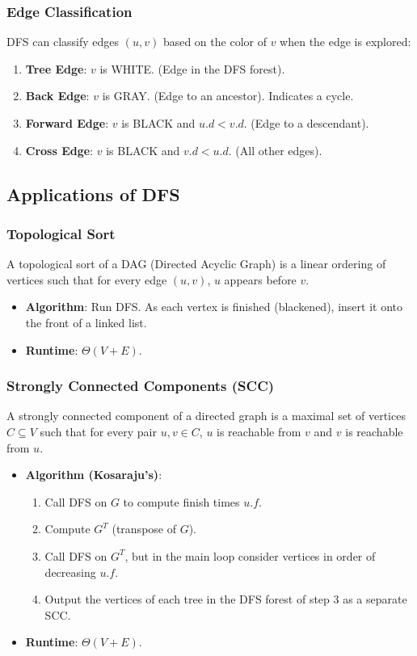 \documentclass[12pt]{article}
\theoremstyle{blueplain}
\theoremstyle{bluedef}
\theoremstyle{blueremark}
\begin{document}
\subsubsection{Edge Classification}
DFS can classify edges $(u, v)$ based on the color of $v$ when the edge is explored:
\begin{enumerate}
    \item \textbf{Tree Edge}: $v$ is WHITE. (Edge in the DFS forest).
    \item \textbf{Back Edge}: $v$ is GRAY. (Edge to an ancestor). Indicates a cycle.
    \item \textbf{Forward Edge}: $v$ is BLACK and $u.d < v.d$. (Edge to a descendant).
    \item \textbf{Cross Edge}: $v$ is BLACK and $v.d < u.d$. (All other edges).
\end{enumerate}

\subsection{Applications of DFS}

\subsubsection{Topological Sort}
A topological sort of a DAG (Directed Acyclic Graph) is a linear ordering of vertices such that for every edge $(u, v)$, $u$ appears before $v$.
\begin{itemize}
    \item \textbf{Algorithm}: Run DFS. As each vertex is finished (blackened), insert it onto the front of a linked list.
    \item \textbf{Runtime}: $\Theta(V + E)$.
\end{itemize}

\subsubsection{Strongly Connected Components (SCC)}
A strongly connected component of a directed graph is a maximal set of vertices $C \subseteq V$ such that for every pair $u, v \in C$, $u$ is reachable from $v$ and $v$ is reachable from $u$.
\begin{itemize}
    \item \textbf{Algorithm (Kosaraju's)}:
          \begin{enumerate}
              \item Call DFS on $G$ to compute finish times $u.f$.
              \item Compute $G^T$ (transpose of $G$).
              \item Call DFS on $G^T$, but in the main loop consider vertices in order of decreasing $u.f$.
              \item Output the vertices of each tree in the DFS forest of step 3 as a separate SCC.
          \end{enumerate}
    \item \textbf{Runtime}: $\Theta(V + E)$.
\end{itemize}
\end{document}
